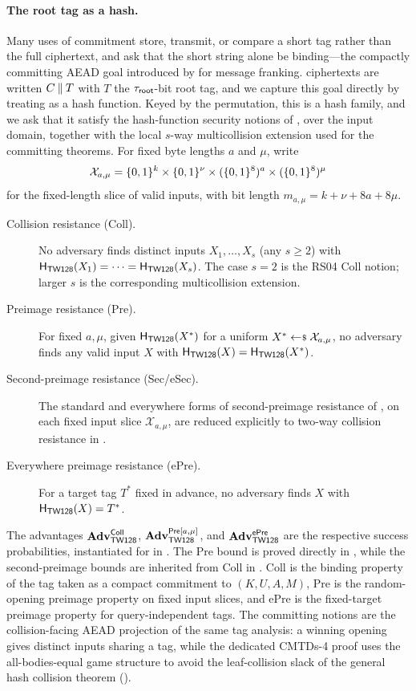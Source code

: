 \paragraph{The root tag as a hash.}
Many uses of commitment store, transmit, or compare a short tag rather
than the full ciphertext, and ask that the short string alone be
binding---the compactly committing AEAD goal introduced by \cite{GLR17}
for message franking. \TW{} ciphertexts are written $C \mathbin{\|} T$ with
$T$ the $\tau_{\mathsf{root}}$-bit root tag, and we capture this goal directly by
treating  as a hash function. Keyed by the permutation,
this is a hash family, and we ask that it satisfy the hash-function
security notions of \cite{RS04}, over the \TW{} input domain, together
with the local $s$-way multicollision extension used for the committing
theorems. For fixed byte lengths $a$ and $\mu$, write
\[
  \mathcal{X}_{a,\mu}
  =
  \{0,1\}^k \times \{0,1\}^\nu \times (\{0,1\}^8)^a \times (\{0,1\}^8)^\mu
\]
for the fixed-length slice of valid inputs, with bit length
$m_{a,\mu} = k + \nu + 8a + 8\mu$.
\begin{description}
  \item[Collision resistance (Coll).] No adversary finds distinct inputs
    $X_1, \dots, X_s$ (any $s \geq 2$) with
    $\mathsf{H}_{\mathsf{TW128}}(X_1) = \cdots = \mathsf{H}_{\mathsf{TW128}}(X_s)$. The case $s=2$ is the RS04 Coll
    notion; larger $s$ is the corresponding multicollision extension.
  \item[Preimage resistance (Pre).] For fixed $a,\mu$, given
    $\mathsf{H}_{\mathsf{TW128}}(X^*)$ for a uniform $X^* \sample \mathcal{X}_{a,\mu}$, no
    adversary finds any valid input $X$ with $\mathsf{H}_{\mathsf{TW128}}(X) = \mathsf{H}_{\mathsf{TW128}}(X^*)$.
  \item[Second-preimage resistance (Sec/eSec).] The standard and
    everywhere forms of second-preimage resistance of \cite{RS04}, on
    each fixed input slice $\mathcal{X}_{a,\mu}$, are reduced explicitly
    to two-way collision resistance in .
  \item[Everywhere preimage resistance (ePre).] For a target tag $T^*$ fixed in
    advance, no adversary finds $X$ with $\mathsf{H}_{\mathsf{TW128}}(X) = T^*$.
\end{description}
The advantages $\mathbf{Adv}^{\mathsf{Coll}}_{\textsf{TW128}}$, $\mathbf{Adv}^{\mathsf{Pre}[a,\mu]}_{\textsf{TW128}}$, and
$\mathbf{Adv}^{\mathsf{ePre}}_{\textsf{TW128}}$ are the respective success probabilities, instantiated for
\TW{} in . The Pre bound is proved directly in
, while the second-preimage bounds are inherited from Coll
in . Coll is the binding property of the tag
taken as a compact commitment to $(K, U, A, M)$, Pre is the random-opening
preimage property on fixed input slices, and ePre is the fixed-target
preimage property for query-independent tags.
The \cite{BH22} committing notions are the collision-facing AEAD
projection of the same tag analysis: a winning opening gives distinct
inputs sharing a tag, while the dedicated CMTDs-4 proof uses the
all-bodies-equal game structure to avoid the leaf-collision slack of the
general hash collision theorem ().

